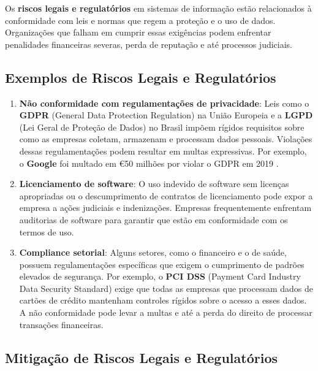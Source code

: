 \documentclass[12pt,oneside,a4paper,article]{abntex2}
\begin{document}
Os \textbf{riscos legais e regulatórios} em sistemas de informação estão relacionados à conformidade com leis e normas que regem a proteção e o uso de dados. Organizações que falham em cumprir essas exigências podem enfrentar penalidades financeiras severas, perda de reputação e até processos judiciais.

\subsection{Exemplos de Riscos Legais e Regulatórios}

\begin{enumerate}
    \item \textbf{Não conformidade com regulamentações de privacidade}:
    Leis como o \textbf{GDPR} (General Data Protection Regulation) na União Europeia e a \textbf{LGPD} (Lei Geral de Proteção de Dados) no Brasil impõem rígidos requisitos sobre como as empresas coletam, armazenam e processam dados pessoais. Violações dessas regulamentações podem resultar em multas expressivas. Por exemplo, o \textbf{Google} foi multado em €50 milhões por violar o GDPR em 2019 \cite{googlefine}.
    
    \item \textbf{Licenciamento de software}:
    O uso indevido de software sem licenças apropriadas ou o descumprimento de contratos de licenciamento pode expor a empresa a ações judiciais e indenizações. Empresas frequentemente enfrentam auditorias de software para garantir que estão em conformidade com os termos de uso.
    
    \item \textbf{Compliance setorial}:
    Alguns setores, como o financeiro e o de saúde, possuem regulamentações específicas que exigem o cumprimento de padrões elevados de segurança. Por exemplo, o \textbf{PCI DSS} (Payment Card Industry Data Security Standard) exige que todas as empresas que processam dados de cartões de crédito mantenham controles rígidos sobre o acesso a esses dados. A não conformidade pode levar a multas e até a perda do direito de processar transações financeiras.
\end{enumerate}

\subsection{Mitigação de Riscos Legais e Regulatórios}
\end{document}
